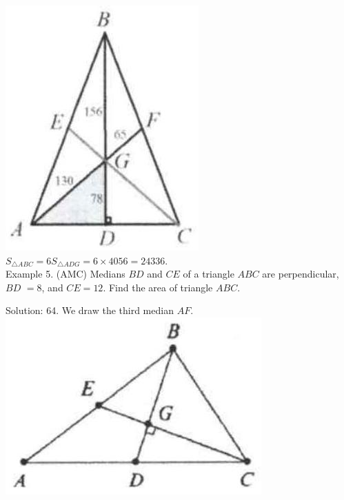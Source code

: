 \documentclass[10pt]{article}
\begin{document}
\includegraphics[max width=\textwidth, center]{2025_04_17_97bc1f7e44d93c271a88g-010}\\
\(S_{\triangle A B C}=6 S_{\triangle A D G}=6 \times 4056=24336\).\\
Example 5. (AMC) Medians \(B D\) and \(C E\) of a triangle \(A B C\) are perpendicular, \(B D\) \(=8\), and \(C E=12\). Find the area of triangle \(A B C\).

Solution: 64.
We draw the third median \(A F\).\\
\includegraphics[max width=\textwidth, center]{2025_04_17_97bc1f7e44d93c271a88g-010(3)}
\end{document}
